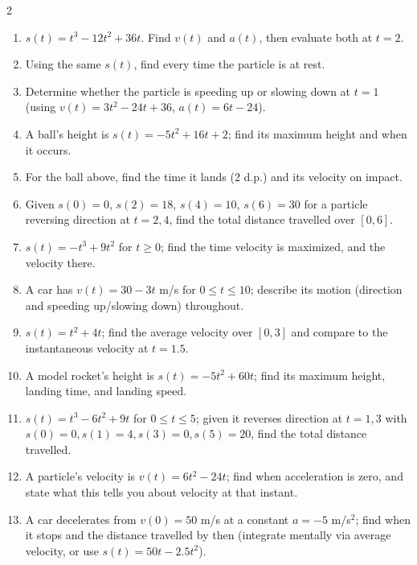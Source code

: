 \documentclass[11pt]{article}
\begin{document}
\begin{recapbox}
\begin{multicols}{2}
\small
\begin{enumerate}[leftmargin=*,itemsep=3pt]
  \item $s(t)=t^3-12t^2+36t$. Find $v(t)$ and $a(t)$, then evaluate both at $t=2$.
  \item Using the same $s(t)$, find every time the particle is at rest.
  \item Determine whether the particle is speeding up or slowing down at $t=1$ (using $v(t)=3t^2-24t+36$, $a(t)=6t-24$).
  \item A ball's height is $s(t)=-5t^2+16t+2$; find its maximum height and when it occurs.
  \item For the ball above, find the time it lands (2 d.p.) and its velocity on impact.
  \item Given $s(0)=0$, $s(2)=18$, $s(4)=10$, $s(6)=30$ for a particle reversing direction at $t=2,4$, find the total distance travelled over $[0,6]$.
  \item $s(t)=-t^3+9t^2$ for $t\geq0$; find the time velocity is maximized, and the velocity there.
  \item A car has $v(t)=30-3t$ m/s for $0\leq t\leq10$; describe its motion (direction and speeding up/slowing down) throughout.
  \item $s(t)=t^2+4t$; find the average velocity over $[0,3]$ and compare to the instantaneous velocity at $t=1.5$.
  \item A model rocket's height is $s(t)=-5t^2+60t$; find its maximum height, landing time, and landing speed.
  \item $s(t)=t^3-6t^2+9t$ for $0\leq t\leq5$; given it reverses direction at $t=1,3$ with $s(0)=0,s(1)=4,s(3)=0,s(5)=20$, find the total distance travelled.
  \item A particle's velocity is $v(t)=6t^2-24t$; find when acceleration is zero, and state what this tells you about velocity at that instant.
  \item A car decelerates from $v(0)=50$ m/s at a constant $a=-5$ m/s$^2$; find when it stops and the distance travelled by then (integrate mentally via average velocity, or use $s(t)=50t-2.5t^2$).
\end{enumerate}
\end{multicols}
\end{recapbox}
\end{document}
